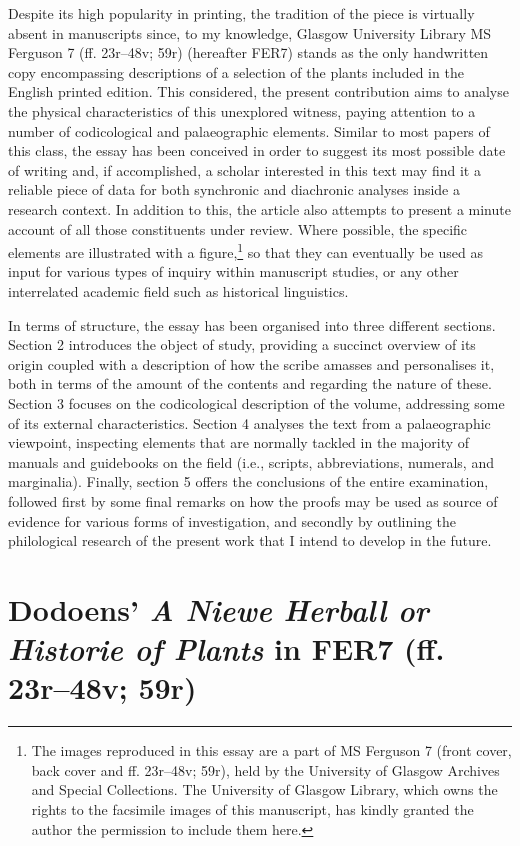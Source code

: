 \documentclass{article}
\begin{document}
Despite its high popularity in printing, the tradition of the piece is
virtually absent in manuscripts since, to my knowledge, Glasgow
University Library MS Ferguson 7 (ff. 23r--48v; 59r) (hereafter FER7)
stands as the only handwritten copy encompassing descriptions of a
selection of the plants included in the English printed edition. This
considered, the present contribution aims to analyse the physical
characteristics of this unexplored witness, paying attention to a number
of codicological and palaeographic elements. Similar to most
papers of this class, the essay has been conceived in order to
suggest its most possible date of writing and, if accomplished, a
scholar interested in this text may find it a reliable piece of data for
both synchronic and diachronic analyses inside a research context. In
addition to this, the article also attempts to present a minute
account of all those constituents under review. Where possible, the specific elements are illustrated with a figure,\footnote{The images reproduced in this essay are a part of MS Ferguson 7 (front cover, back cover and ff. 23r--48v; 59r), held by the University of Glasgow Archives and Special Collections. The University of Glasgow Library, which owns the rights to the facsimile images of this manuscript, has kindly granted the author the permission to include them here.} so
that they can eventually be used as input for various types of inquiry
within manuscript studies, or any other interrelated academic field
such as historical linguistics.

In terms of structure, the essay has been organised into three different
sections. Section 2 introduces the object of study,
providing a succinct overview of its origin coupled with a description
of how the scribe amasses and personalises it, both in terms of the
amount of the contents and regarding the nature of these. Section 3 focuses on the codicological description of the volume, addressing
some of its external characteristics. Section 4 analyses the
text from a palaeographic viewpoint, inspecting
elements that are normally tackled in the majority of manuals and
guidebooks on the field (i.e., scripts, abbreviations, numerals, and
marginalia). Finally, section 5 offers the conclusions of the
entire examination, followed first by some final remarks on how the
proofs may be used as source of evidence for various forms of investigation, and secondly by outlining the philological research
of the present work that I intend to develop in the future.

\section{Dodoens' \emph{A Niewe Herball or Historie of Plants} in FER7
(ff. 23r--48v; 59r)}
\end{document}
